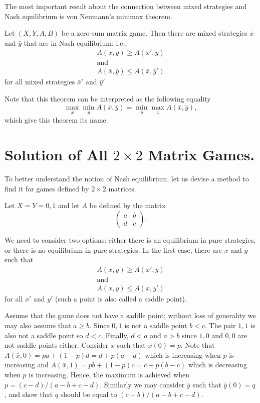 The most important result about the connection between mixed strategies and Nash
equilibrium is von Neumann's minimax theorem.
\begin{theorem}
  Let $(X, Y, A, B)$ be a zero-sum matrix game. Then there are mixed
  strategies $\bar{x}$ and $\bar{y}$ that are in Nash equilibrium; i.e., 
  \begin{gather*}
    A(\bar{x}, \bar{y}) \ge A(\bar{x}', \bar{y}) \\
    \text{and} \\
    A(\bar{x}, \bar{y}) \le A(\bar{x}, \bar{y}')
  \end{gather*}
  for all mixed strategies $\bar{x}'$ and $\bar{y}'$
\end{theorem}
Note that this theorem can be interpreted as the following equality 
\[
  \max_{\bar{x}} \min_{\bar{y}} A(\bar{x}, \bar{y}) = 
  \min_{\bar{y}} \max_{\bar{x}} A(\bar{x}, \bar{y}),
\]
which give this theorem its name.

\section{Solution of All $2 \times 2$ Matrix Games.}
To better understand the notion of Nash equilibrium, let us devise a method to
find it for games defined by $2 \times 2$ matrices.

Let $X = Y = 0, 1$ and let $A$ be defined by the matrix 
\[
  \begin{pmatrix}
    a & b \\
    d & c
  \end{pmatrix}.
\]

We need to consider two options: either there is an equilibrium in pure
strategies, or there is no equilibrium in pure strategies.
In the first case, there are $x$ and $y$ such that 
\begin{gather*}
  A(x, y) \ge A(x', y) \\
  \text{and} \\
  A(x, y) \le A(x, y') 
\end{gather*}
for all $x'$ and $y'$ (such a point is also called a saddle point).

Assume that the game does not have a saddle point; without loss of generality we
may also assume that $a \ge b$. Since $0, 1$ is not a saddle point $b < c$.
The pair $1, 1$ is also not a saddle point so $d < c$. Finally, $d < a$ and $a >
b$ since $1, 0$ and $0, 0$ are not saddle points either. Consider $\bar{x}$ such
that $\bar{x}(0) = p$. Note that $A(\bar{x}, 0) =  p a + (1 - p) d = 
d + p (a - d)$ which is increasing when $p$ is increasing and 
$A(\bar{x}, 1) =  p b + (1 - p) c = c + p (b - c)$ which is decreasing when $p$
is increasing. Hence, the maximum is achieved when 
$p = (c - d) / (a - b + c - d)$. Similarly we may consider $\bar{y}$ such that
$\bar{y}(0) = q$, and show that $q$ should be equal to 
$(c - b) / (a - b + c - d)$.
